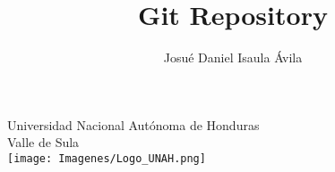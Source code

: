 \documentclass[12pt,a4paper]{article}
\author{Josué Daniel Isaula Ávila}
\title{Git Repository}
\begin{document}
\maketitle 

\begin{center}
    \huge Universidad Nacional Autónoma de Honduras \\ 
    \large Valle de Sula \\
    \vspace{5 mm}
    \texttt{[image: Imagenes/Logo\_UNAH.png]}
\end{center}
\newpage
\end{document}
